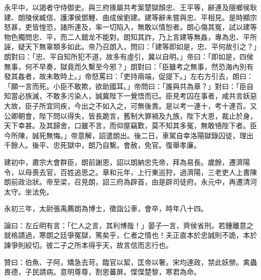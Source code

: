 \begin{pinyinscope}
永平中，以謁者守侍御史。與三府掾屬共考案楚獄顏忠、王平等，辭連及隧鄉侯耿建、朗陵侯臧信、護澤侯鄧鯉、曲成侯劉建。建等辭未嘗與忠、平相見。是時顯宗怒甚，吏皆惶恐，諸所連及，率一切陷入，無敢以情恕者。朗心傷其冤，試以建等物色獨問忠、平，而二人錯龙不能對。朗知其詐，乃上言建等無姦，專為忠、平所誣，疑天下無辜類多如此。帝乃召朗入，問曰：「建等即如是，忠、平何故引之？」朗對曰：「忠、平自知所犯不道，故多有虛引，冀以自明。」帝曰：「即如是，四侯無事，何不早奏，獄竟而久繫至今邪？」朗對曰：「臣雖考之無事，然恐海內別有發其姦者，故未敢時上。」帝怒罵曰：「吏持兩端，促提下。」左右方引去，朗曰：「願一言而死。小臣不敢欺，欲助國耳。」帝問曰：「誰與共為章？」對曰：「臣自知當必族滅，不敢多污染人，誠冀陛下一覺悟而已。臣見考囚在事者，咸共言妖惡大故，臣子所宜同疾，今出之不如入之，可無後責。是以考一連十，考十連百。又公卿朝會，陛下問以得失，皆長跪言，舊制大罪禍及九族，陛下大恩，裁止於身，天下幸甚。及其歸舍，口雖不言，而仰屋竊歎，莫不知其多冤，無敢啎陛下者。臣今所陳，誠死無悔。」帝意解，詔遣朗出。後二日，車駕自幸洛陽獄錄囚徒，理出千餘人。後平、忠死獄中，朗乃自繫。會赦，免官。復舉孝廉。

建初中，肅宗大會群臣，朗前謝恩，詔以朗納忠先帝，拜為易長。歲餘，遷濟陽令，以母喪去官，百姓追思之。章和元年，上行東巡狩，過濟陽，三老吏人上書陳朗前政治狀。帝至梁，召見朗，詔三府為辟首，由是辟司徒府。永元中，再遷清河太守。坐法免。

永初三年，太尉張禹薦朗為博士，徵詣公車，會卒，時年八十四。

論曰：左丘明有言：「仁人之言，其利博哉！」晏子一言，齊侯省刑。若鍾離意之就格請過，寒朗之廷爭冤獄，篤矣乎，仁者之情也！夫正直本於忠誠則不詭，本於諫爭則絞切。彼二子之所本得乎天，故言信而志行也。

贊曰：伯魚、子阿，矯急去苛。臨官以絜，匡帝以奢。宋均達政，禁此妖禜。禽蟲畏德，子民請病。意明尊尊，割恩蕃屏。惵惵楚黎，寒君為命。


\end{pinyinscope}